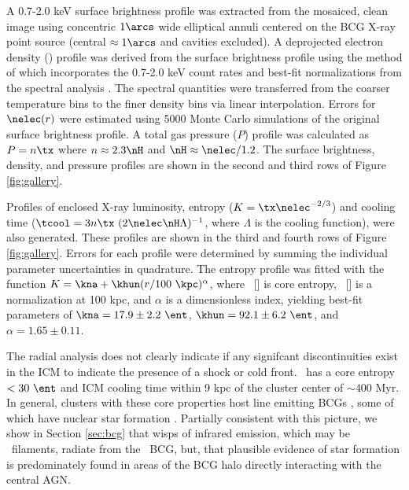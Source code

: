 \documentclass[iop]{emulateapj}
\begin{document}
A 0.7-2.0 keV surface brightness profile was extracted from the
mosaiced, clean image using concentric $1\arcs$ wide elliptical annuli
centered on the BCG X-ray point source (central $\approx 1\arcs$ and
cavities excluded). A deprojected electron density (\nelec) profile
was derived from the surface brightness profile using the method of
\citet{kriss83} which incorporates the 0.7-2.0 keV count rates and
best-fit normalizations from the spectral analysis \citep[see][for
  details]{accept}. The spectral quantities were transferred from the
coarser temperature bins to the finer density bins via linear
interpolation. Errors for $\nelec(r)$ were estimated using 5000 Monte
Carlo simulations of the original surface brightness profile. A total
gas pressure ($P$) profile was calculated as $P = n \tx$ where $n
\approx 2.3 \nH$ and $\nH \approx \nelec/1.2$. The surface brightness,
density, and pressure profiles are shown in the second and third rows
of Figure \ref{fig:gallery}.

Profiles of enclosed X-ray luminosity, entropy ($K = \tx
\nelec^{-2/3}$) and cooling time ($\tcool = 3 n \tx~(2 \nelec \nH
\Lambda)^{-1}$, where $\Lambda$ is the cooling function), were also
generated. These profiles are shown in the third and fourth rows of
Figure \ref{fig:gallery}. Errors for each profile were determined by
summing the individual parameter uncertainties in quadrature. The
entropy profile was fitted with the function $K = \kna +\khun (r/100
~\kpc)^{\alpha}$, where \kna\ [\ent] is core entropy, \khun\ [\ent] is
a normalization at 100 kpc, and $\alpha$ is a dimensionless index,
yielding best-fit parameters of $\kna = 17.9 \pm 2.2 ~\ent$, $\khun =
92.1 \pm 6.2 ~\ent$, and $\alpha = 1.65 \pm 0.11$.

The radial analysis does not clearly indicate if any signifcant
discontinuities exist in the ICM to indicate the presence of a shock
or cold front. \rbs\ has a core entropy $< 30 ~\ent$ and ICM cooling
time within 9 kpc of the cluster center of $\sim 400$ Myr. In general,
clusters with these core properties host line emitting BCGs
\citep[\eg][]{crawford99, edge01, haradent}, some of which have
nuclear star formation \citep[\eg][]{rafferty08}. Partially consistent
with this picture, we show in Section \ref{sec:bcg} that wisps of
infrared emission, which may be \halpha\ filaments, radiate from the
\rbs\ BCG, but, that plausible evidence of star formation is
predominately found in areas of the BCG halo directly interacting with
the central AGN.

\end{document}
